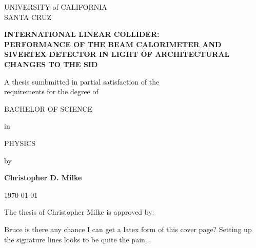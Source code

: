\documentclass{report}
\begin{document}
	\begin{titlepage} \begin{singlespace}
        \begin{center} \begin{large}
            UNIVERSITY of CALIFORNIA \\ SANTA CRUZ

            \vspace{\baselineskip}

            \textbf{INTERNATIONAL LINEAR COLLIDER: \\ PERFORMANCE OF THE BEAM CALORIMETER AND SIVERTEX DETECTOR  IN LIGHT OF ARCHITECTURAL CHANGES TO THE SID}

            \vspace{\baselineskip}

            A thesis sumbmitted in partial satisfaction of the \\ requirements for the degree of

            \vspace{\baselineskip}

            BACHELOR OF SCIENCE

            \vspace{\baselineskip}

            in

            \vspace{\baselineskip}

            PHYSICS

            \vspace{\baselineskip}

            by

            \vspace{\baselineskip}

            \textbf{Christopher D. Milke}

            \vspace{\baselineskip}

            \today

            \vspace*{\fill}

            \end{large}

            The thesis of Christopher Milke is approved by:
        \end{center}

        Bruce is there any chance I can get a latex form of this cover page? Setting up the signature lines looks to be quite the pain...
	\end{singlespace} \end{titlepage}
\end{document}
